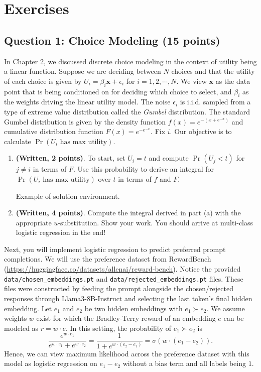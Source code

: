 \documentclass[
  letterpaper,
  DIV=11,
  numbers=noendperiod,
  oneside]{scrreprt}
\let\oldchapter\chapter
\def\chapter{%
  \setcounter{sidenote}{1}%
  \oldchapter
}
\theoremstyle{remark}
\begin{document}
\chapter{Exercises}\label{exercises}

\section*{Question 1: Choice Modeling (15
points)}\label{question-1-choice-modeling-15-points}


In Chapter 2, we discussed discrete choice modeling in the context of
utility being a linear function. Suppose we are deciding between \(N\)
choices and that the utility of each choice is given by
\(U_i=\beta_i\mathbf{x}+\epsilon_i\) for \(i=1, 2, \cdots, N\). We view
\(\mathbf{x}\) as the data point that is being conditioned on for
deciding which choice to select, and \(\beta_i\) as the weights driving
the linear utility model. The noise \(\epsilon_i\) is i.i.d. sampled
from a type of extreme value distribution called the \emph{Gumbel}
distribution. The standard Gumbel distribution is given by the density
function \(f(x)=e^{-(x+e^{-x})}\) and cumulative distribution function
\(F(x)=e^{-e^{-x}}.\) Fix \(i\). Our objective is to calculate
\(\Pr(U_i\,\, \text{has max utility})\).

\begin{enumerate}
\def\labelenumi{(\alph{enumi})}
\item
  \textbf{(Written, 2 points)}. To start, set \(U_i=t\) and compute
  \(\Pr(U_j<t)\) for \(j\neq i\) in terms of \(F\). Use this probability
  to derive an integral for \(\Pr(U_i\,\,  \text{has max utility})\)
  over \(t\) in terms of \(f\) and \(F\).

  Example of solution environment.
\item
  \textbf{(Written, 4 points)}. Compute the integral derived in part (a)
  with the appropriate \(u\)-substitution. Show your work. You should
  arrive at multi-class logistic regression in the end!
\end{enumerate}

Next, you will implement logistic regression to predict preferred prompt
completions. We will use the preference dataset from RewardBench
(\url{https://huggingface.co/datasets/allenai/reward-bench}). Notice the
provided \texttt{data/chosen\_embeddings.pt} and
\texttt{data/rejected\_embeddings.pt} files. These files were
constructed by feeding the prompt alongside the chosen/rejected
responses through Llama3-8B-Instruct and selecting the last token's
final hidden embedding. Let \(e_1\) and \(e_2\) be two hidden embeddings
with \(e_1\succ e_2\). We assume weights \(w\) exist for which the
Bradley-Terry reward of an embedding \(e\) can be modeled as
\(r=w\cdot e\). In this setting, the probability of \(e_1\succ e_2\) is
\[\frac{e^{w\cdot e_1}}{e^{w\cdot e_1}+e^{w\cdot e_2}}=\frac{1}{1+e^{w\cdot(e_2-e_1)}}=\sigma(w\cdot(e_1-e_2)).\]
Hence, we can view maximum likelihood across the preference dataset with
this model as logistic regression on \(e_1-e_2\) without a bias term and
all labels being \(1\).
\end{document}
